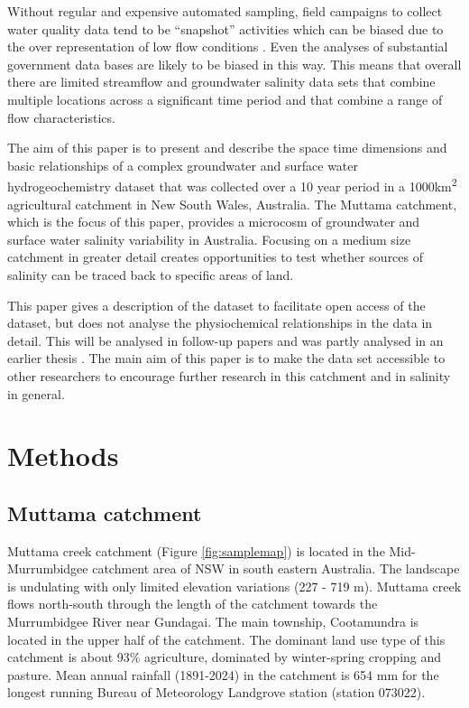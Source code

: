\documentclass[, manuscript]{copernicus}
\begin{document}
Without regular and expensive automated sampling, field campaigns to
collect water quality data tend to be ``snapshot'' activities
\citep{Grayson1997, Breuer2015, Lyon2008, Cartwright2010, Lintern2018}
which can be biased due to the over representation of low flow
conditions \citep{Lessels2020}. Even the analyses of substantial
government data bases \citep{Lintern2018} are likely to be biased in
this way. This means that overall there are limited streamflow and
groundwater salinity data sets that combine multiple locations across a
significant time period and that combine a range of flow
characteristics.

The aim of this paper is to present and describe the space time
dimensions and basic relationships of a complex groundwater and surface
water hydrogeochemistry dataset that was collected over a 10 year period
in a 1000km\textsuperscript{2} agricultural catchment in New South
Wales, Australia. The Muttama catchment, which is the focus of this
paper, provides a microcosm of groundwater and surface water salinity
variability in Australia. Focusing on a medium size catchment in greater
detail creates opportunities to test whether sources of salinity can be
traced back to specific areas of land.

This paper gives a description of the dataset to facilitate open access
of the dataset, but does not analyse the physiochemical relationships in
the data in detail. This will be analysed in follow-up papers and was
partly analysed in an earlier thesis \citep{Akter2018}. The main aim of
this paper is to make the data set accessible to other researchers to
encourage further research in this catchment and in salinity in general.

\section{Methods}

\subsection{Muttama catchment}

Muttama creek catchment (Figure \ref{fig:samplemap}) is located in the
Mid-Murrumbidgee catchment area of NSW in south eastern Australia. The
landscape is undulating with only limited elevation variations (227 -
719 m). Muttama creek flows north-south through the length of the
catchment towards the Murrumbidgee River near Gundagai. The main
township, Cootamundra is located in the upper half of the catchment. The
dominant land use type of this catchment is about 93\% agriculture,
dominated by winter-spring cropping and pasture. Mean annual rainfall
(1891-2024) in the catchment is 654 mm for the longest running Bureau of
Meteorology Landgrove station (station 073022).
\end{document}
